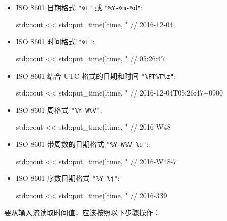 \begin{itemize}
\item
ISO 8601 日期格式 \verb|"%F"| 或 \verb|"%Y-%m-%d"|:

\begin{cpp}
std::cout << std::put_time(ltime, "%
// 2016-12-04
\end{cpp}

\item
ISO 8601 时间格式 \verb|"%T"|:

\begin{cpp}
std::cout << std::put_time(ltime, "%
// 05:26:47
\end{cpp}

\item
ISO 8601 结合 UTC 格式的日期和时间 \verb|"%FT%T%z"|:

\begin{cpp}
std::cout << std::put_time(ltime, "%
// 2016-12-04T05:26:47+0900
\end{cpp}

\item
ISO 8601 周格式 \verb|"%Y-W%V"|:

\begin{cpp}
std::cout << std::put_time(ltime, "%
// 2016-W48
\end{cpp}

\item
ISO 8601 带周数的日期格式 \verb|"%Y-W%V-%u"|:

\begin{cpp}
std::cout << std::put_time(ltime, "%
// 2016-W48-7
\end{cpp}

\item
ISO 8601 序数日期格式 \verb|"%Y-%j"|:

\begin{cpp}
std::cout << std::put_time(ltime, "%
// 2016-339
\end{cpp}
\end{itemize}

要从输入流读取时间值，应该按照以下步骤操作：

